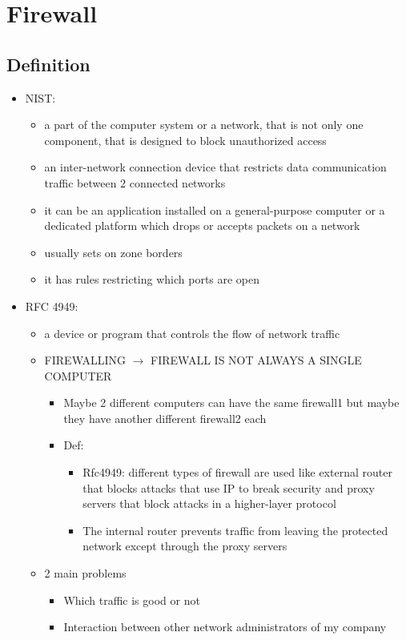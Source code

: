 \documentclass{article}
\begin{document}
\section{Firewall}
\subsection{Definition}
\begin{itemize}
\item NIST:
  \begin{itemize}
    \item a part of the computer system or a network, that is not only one component, that is designed to block unauthorized access
    \item an inter-network connection device that restricts data communication traffic between 2 connected networks
    \item it can be an application installed on a general-purpose computer or a dedicated platform which drops or accepts packets on a network
    \item usually sets on zone borders
    \item it has rules restricting which ports are open
  \end{itemize}
\item RFC 4949: 
  \begin{itemize}
    \item a device or program that controls the flow of network traffic
    \item FIREWALLING $\rightarrow$ FIREWALL IS NOT ALWAYS A SINGLE COMPUTER 
      \begin{itemize}
        \item Maybe 2 different computers can have the same firewall1 but maybe they have another different firewall2 each
        \item Def: 
          \begin{itemize}
            \item Rfc4949: different types of firewall are used like external router that blocks attacks that use IP to break security and proxy servers that block attacks in a higher-layer protocol
            \item The internal router prevents traffic from leaving the protected network except through the proxy servers
          \end{itemize}
      \end{itemize}
  
    
    \item 2 main problems
    \begin{itemize}
        \item Which traffic is good or not
        \item Interaction between other network administrators of my company
    \end{itemize}
    

\end{itemize}
\end{itemize}
\end{document}
